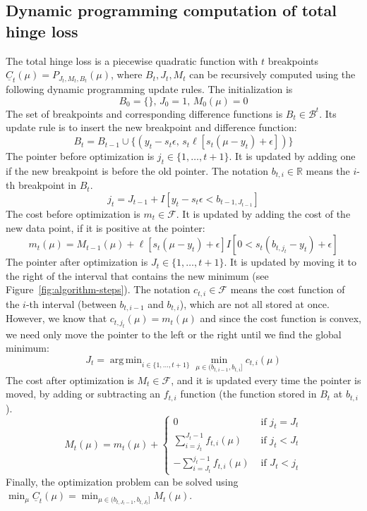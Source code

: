 \documentclass{article}
\DeclareMathOperator*{\argmin}{arg\,min}
\begin{document}
\subsection{Dynamic programming computation of total hinge loss}
The total hinge loss is a piecewise quadratic function with $t$
breakpoints $\underline C_t(\mu)=P_{J_t,M_t,B_t}(\mu)$, where
$B_t,J_t,M_t$ can be recursively computed using the following dynamic
programming update rules. The initialization is
\begin{equation}
  \label{eq:init}
  B_0=\{\},\, J_0=1,\, M_0(\mu)=0
\end{equation}
The set of breakpoints and corresponding difference functions is
$B_t\in\mathcal B^t$. Its update rule is to insert the new breakpoint
and difference function:
\begin{equation}
  \label{eq:B_t}
  B_t=B_{t-1}\cup \{(y_t-s_t\epsilon,\, s_t\ell[s_t(\mu-y_t)+\epsilon])\}
\end{equation}
The pointer before optimization is $j_t\in\{1,\dots,t+1\}$. It is
updated by adding one if the new breakpoint is before the old
pointer. The notation $b_{t,i}\in\mathbb R$ means the $i$-th
breakpoint in $B_t$.
\begin{equation}
  \label{eq:j_t}
  j_t = J_{t-1} + I[y_t-s_t\epsilon < b_{t-1,J_{t-1}}]
\end{equation}
The cost before optimization is $m_t\in\mathcal F$. It is updated by adding the
cost of the new data point, if it is positive at the pointer:
\begin{equation}
  \label{eq:m_t}
  m_t(\mu) = M_{t-1}(\mu) + 
  \ell[s_t(\mu-y_t)+\epsilon]
  I[0<s_t(b_{t,j_t}-y_t)+\epsilon]
\end{equation}
The pointer after optimization is $J_t\in\{1,\dots,t+1\}$. It is
updated by moving it to the right of the interval that contains the
new minimum (see Figure~\ref{fig:algorithm-steps}). The notation
$c_{t,i}\in\mathcal F$ means the cost function of the $i$-th interval
(between $b_{t,i-1}$ and $b_{t,i}$), which are not all stored at
once. However, we know that $c_{t,j_t}(\mu)=m_t(\mu)$ and since the
cost function is convex, we need only move the pointer to the left or
the right until we find the global minimum:
\begin{equation}
  \label{eq:J_t}
  J_t = \argmin_{i\in\{1,\dots, t+1\}}
  \min_{\mu\in(b_{t,i-1},b_{t,i}]} c_{t,i}(\mu)
\end{equation}
The cost after optimization is $M_t\in\mathcal F$, and it is updated every time
the pointer is moved, by adding or subtracting an $f_{t,i}$ function
(the function stored in $B_t$ at $b_{t,i}$).
\begin{equation}
  \label{eq:M_t}
  M_t(\mu)=m_t(\mu) +
  \begin{cases}
    0 & \text{ if } j_t = J_t\\
    \sum_{i=j_t}^{J_t-1} f_{t,i}(\mu) & \text{ if } j_t < J_t\\
    -\sum_{i=J_t}^{j_t-1} f_{t,i}(\mu) & \text{ if } J_t < j_t
  \end{cases}
\end{equation}
Finally, the optimization problem can be solved using
$\min_\mu\underline
C_t(\mu)=\min_{\mu\in(b_{t,J_t-1},b_{t,J_t}]}M_t(\mu)$.
\end{document}
